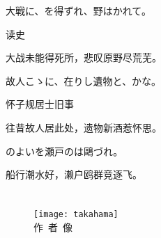\setcounter{haikucounter}{0}

\begin{haiku}
    {\FH 大戦に、を得ずれ、野はかれて。}

    {\FK 读史}

    {\FK 大战未能得死所，悲叹原野尽荒芜。}
\end{haiku}

\begin{haiku}
    {\FH 故人こゝに、在りし遺物と、かな。}

    {\FK 怀子规居士旧事}

    {\FK 往昔故人居此处，遗物新酒惹怀思。}
\end{haiku}

\begin{haiku}
    {\FH {}のよいを瀬戸のは鷗づれ。}

    {\FK 船行潮水好，濑户鸥群竞逐飞。}
\end{haiku}

\chapter[{\FM 高浜虚子}]{\FM {}}

\begin{center}
    \begin{figure}
        \centering
        \texttt{[image: takahama]}\\[1em]
        \large{\FS 作~者~像}
    \end{figure}
\end{center}

\newpage

